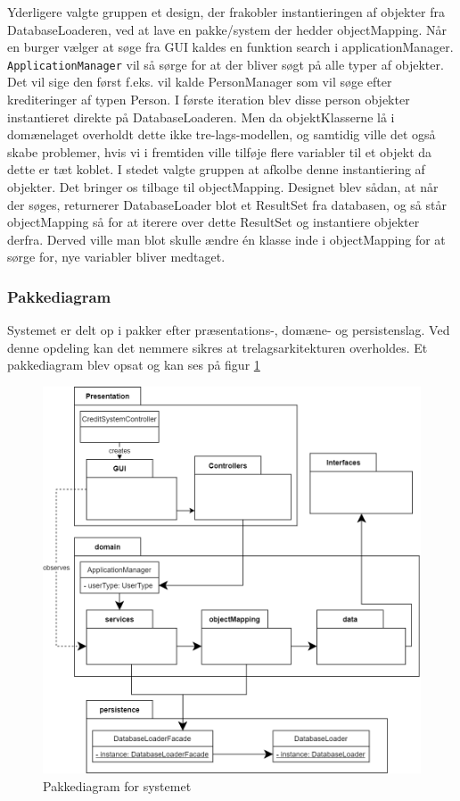 Yderligere valgte gruppen et design, der frakobler instantieringen af objekter fra DatabaseLoaderen, ved at lave en pakke/system der hedder objectMapping. Når en burger vælger at søge fra GUI kaldes en funktion search i applicationManager. \texttt{ApplicationManager} vil så sørge for at der bliver søgt på alle typer af objekter. Det vil sige den først f.eks. vil kalde PersonManager som vil søge efter krediteringer af typen Person. I første iteration blev disse person objekter instantieret direkte på DatabaseLoaderen. Men da objektKlasserne lå i domænelaget overholdt dette ikke  tre-lags-modellen, og samtidig ville det også skabe problemer, hvis vi i fremtiden ville tilføje flere variabler til et objekt da dette er tæt koblet. I stedet valgte gruppen at afkolbe denne instantiering af objekter. Det bringer os tilbage til objectMapping. Designet blev sådan, at når der søges, returnerer DatabaseLoader blot et ResultSet fra databasen, og så står objectMapping så for at iterere over dette ResultSet og instantiere objekter derfra. Derved ville man blot skulle ændre én klasse inde i objectMapping for at sørge for, nye variabler bliver medtaget.


\subsubsection{Pakkediagram} Systemet er delt op i pakker efter præsentations-,
domæne- og persistenslag. Ved denne opdeling kan det nemmere sikres at
trelagsarkitekturen overholdes. Et pakkediagram blev opsat og kan ses på figur
\ref{fig:PackageDiagram}

\begin{figure}[H]
    \centering
\includegraphics[scale = 0.26]{images/PackageDiagram.png}
    \caption{Pakkediagram for systemet}
    \label{fig:PackageDiagram}
\end{figure}

